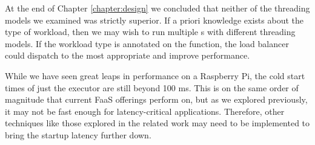 At the end of Chapter \ref{chapter:design} we concluded that neither of the threading models we examined was strictly superior. If a priori knowledge exists about the type of workload, then we may wish to run multiple s with different threading models. If the workload type is annotated on the function, the load balancer could dispatch to the most appropriate  and improve performance.

While we have seen great leaps in performance on a Raspberry Pi, the cold start times of just the executor are still beyond 100 ms. This is on the same order of magnitude that current FaaS offerings perform on, but as we explored previously, it may not be fast enough for latency-critical applications. Therefore, other techniques like those explored in the related work may need to be implemented to bring the startup latency further down.

